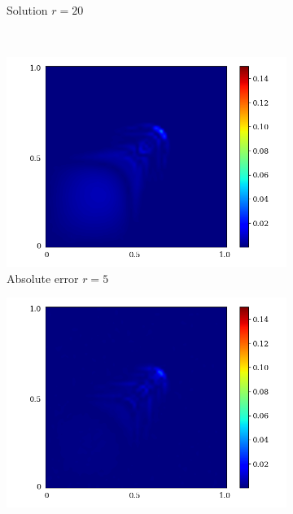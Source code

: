 \begin{figure}[!htb]
\begin{center}
\begin{subfigure}[b]{0.23\textwidth}
\begin{center}
            \end{center}
            \caption{Solution $r = 20$}
        \end{subfigure}\\  
        \begin{subfigure}[b]{0.23\textwidth}
            \begin{center}
                \includegraphics[trim = {0, 0, 3cm, 0}, clip, width=\textwidth]{Pictures/X-rom-LE-DAE-5-abs-err.png}
            \end{center}
            \caption{Absolute error $r = 5$}
        \end{subfigure}  
        \begin{subfigure}[b]{0.23\textwidth}
            \begin{center}
                \includegraphics[trim = {0, 0, 3cm, 0}, clip, width=\textwidth]{Pictures/X-rom-LE-DAE-10-abs-err.png}

\end{center}
\end{subfigure}
\end{center}
\end{figure}
